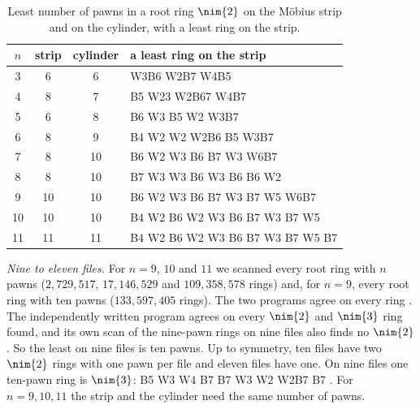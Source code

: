 \begin{table}[!htbp]
\centering
\caption{Least number of pawns in a root ring $\nim{2}$ on the M\"obius strip and on the cylinder, with a least ring on the strip.}
\label{tab:mobring}
\begin{tabular}{@{}cccl@{}}
\toprule
$n$ & strip & cylinder & a least ring on the strip\\
\midrule
3 & 6 & 6 & W3B6 W2B7 W4B5\\
4 & 8 & 7 & B5 W23 W2B67 W4B7\\
5 & 6 & 8 & B6 W3 B5 W2 W3B7\\
6 & 8 & 9 & B4 W2 W2 W2B6 B5 W3B7\\
7 & 8 & 10 & B6 W2 W3 B6 B7 W3 W6B7\\
8 & 8 & 10 & B7 W3 W3 B6 W3 B6 B6 W2\\
9 & 10 & 10 & B6 W2 W3 B6 B7 W3 B7 W5 W6B7\\
10 & 10 & 10 & B4 W2 B6 W2 W3 B6 B7 W3 B7 W5\\
11 & 11 & 11 & B4 W2 B6 W2 W3 B6 B7 W3 B7 W5 B7\\
\bottomrule
\end{tabular}
\end{table}

\emph{Nine to eleven files.} For $n=9$, $10$ and $11$ we scanned every root ring with $n$ pawns ($2{,}729{,}517$,
$17{,}146{,}529$ and $109{,}358{,}578$ rings) and, for $n=9$, every root ring with ten pawns ($133{,}597{,}405$ rings).
The two programs agree on every ring . The independently written program agrees on every $\nim{2}$ and
$\nim{3}$ ring found, and its own scan of the nine-pawn rings on nine files also finds no $\nim{2}$ . So the
least on nine files is ten pawns. Up to symmetry, ten files have two $\nim{2}$ rings with one pawn per file and
eleven files have one. On nine files one ten-pawn ring is $\nim{3}$: B5 W3 W4 B7 B7 W3 W2 W2B7 B7 . For
$n=9,10,11$ the strip and the cylinder need the same number of pawns.

